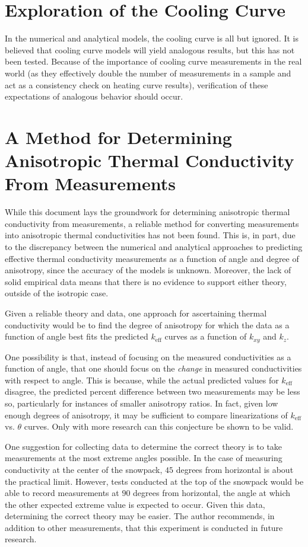 \section{Exploration of the Cooling Curve}

In the numerical and analytical models, the cooling curve is all but ignored. It
is believed that cooling curve models will yield analogous results, but this has
not been tested. Because of the importance of cooling curve measurements in the
real world (as they effectively double the number of measurements in a sample
and act as a consistency check on heating curve results),
verification of these expectations of analogous behavior should occur.

\section{A Method for Determining Anisotropic Thermal Conductivity From Measurements}

While this document lays the groundwork for determining anisotropic thermal
conductivity from measurements, a reliable method for converting measurements
into anisotropic thermal conductivities has not been found. This is, in part,
due to the discrepancy between the numerical and analytical approaches to
predicting effective thermal conductivity measurements as a function of angle
and degree of anisotropy, since the accuracy of the models is unknown.
Moreover, the lack of solid empirical data means that there is no evidence to
support either theory, outside of the isotropic case.

Given a reliable theory and data, one approach for ascertaining thermal
conductivity would be to find the degree of anisotropy for which the data as a
function of angle best fits the predicted \(k_{\textrm{eff}}\) curves
as a function of \(k_{xy}\) and \(k_z\).

One possibility is that, instead of focusing on the measured conductivities as a
function of angle, that one should focus on the \emph{change} in measured
conductivities with respect to angle. This is because, while the actual predicted
values for \(k_{\textrm{eff}}\) disagree, the predicted percent difference
between two measurements may be less so, particularly for instances of smaller
anisotropy ratios. In fact, given low enough degrees of
anisotropy, it may be sufficient to compare linearizations of
\(k_{\textrm{eff}}\) vs. \(\theta\) curves. Only with more research can this
conjecture be shown to be valid.

One suggestion for collecting data to determine the correct theory is to take
measurements at the most extreme angles possible. In the case of measuring
conductivity at the center of the snowpack, \(45\) degrees from horizontal is
about the practical limit. However, tests conducted at the top of the snowpack
would be able to record measurements at \(90\) degrees from horizontal, the angle
at which the other expected extreme value is expected to occur. Given this data,
determining the correct theory may be easier. The author recommends, in addition
to other measurements, that this experiment is conducted in future research.

